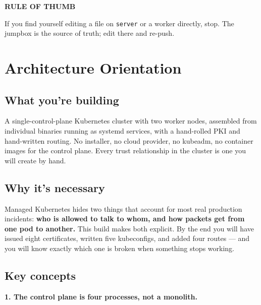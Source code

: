 \documentclass[11pt,oneside]{report}
\newcommand{\calloutlabel}[2]{{\sffamily\bfseries\footnotesize\color{#1}#2\quad}}
\begin{document}
\begin{tipbox}\calloutlabel{teal}{RULE OF THUMB}

If you find yourself
editing a file on
\texttt{server} or a
worker directly,
stop. The jumpbox is
the source of truth;
edit there and
re-push.

\end{tipbox}

\hypertarget{chap-0}{%
\chapter{Architecture
Orientation}\label{chap-0}}

\hypertarget{what-youre-building}{%
\section{What you're
building}\label{what-youre-building}}

A
single-control-plane
Kubernetes cluster
with two worker
nodes, assembled
from individual
binaries running as
systemd services,
with a hand-rolled
PKI and hand-written
routing. No
installer, no cloud
provider, no
kubeadm, no
container images for
the control plane.
Every trust
relationship in the
cluster is one you
will create by hand.

\hypertarget{why-its-necessary}{%
\section{Why it's
necessary}\label{why-its-necessary}}

\begin{whybox}

Managed Kubernetes
hides two things
that account for
most real production
incidents:
\textbf{who is
allowed to talk to
whom, and how
packets get from one
pod to another.}
This build makes
both explicit. By
the end you will
have issued eight
certificates,
written five
kubeconfigs, and
added four routes
--- and you will
know exactly which
one is broken when
something stops
working.

\end{whybox}

\hypertarget{key-concepts}{%
\section{Key
concepts}\label{key-concepts}}

\textbf{1. The
control plane is
four processes, not
a monolith.}
\end{document}
